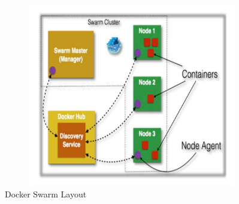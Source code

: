 \begin{figure}[htb]
\centering
\includegraphics[width=12cm,height=8cm]{5-contents/3-what-is-docker-relation-between-cloud-computing-and-docker/images/docker-swarm-layout.png} %
\caption{Docker Swarm Layout}
\label{fig:label} %
\end{figure}